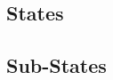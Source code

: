 
\subsection{States}
\label{loc:SaM_States}


\subsection{Sub-States}
\label{loc:SaM_SubStates}


% 

% 


